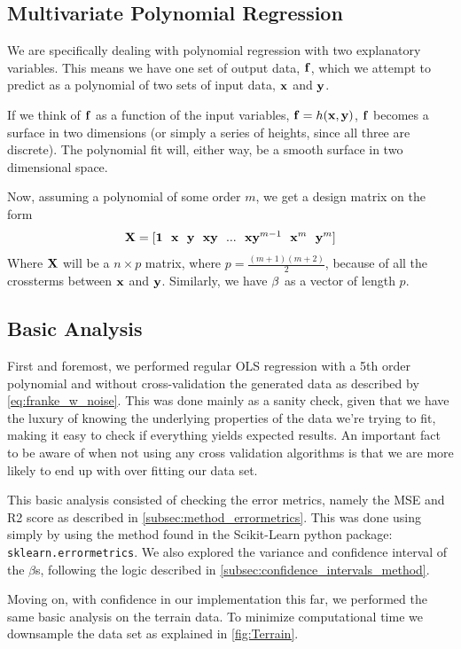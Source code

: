 \documentclass[10pt, twocolumn]{article}
\renewcommand{\b}{\boldsymbol}
\begin{document}
\subsection{Multivariate Polynomial Regression}
We are specifically dealing with polynomial regression with two explanatory variables. This means we have one set of output data, $\vb{f}$, which we attempt to predict as a polynomial of two sets of input data, $\vb{x}$ and $\vb{y}$. 

If we think of $\vb{f}$ as a function of the input variables, $\vb{f} = h(\vb{x}, \vb{y} )$, $\vb{f}$ becomes a surface in two dimensions (or simply a series of heights, since all three are discrete). The polynomial fit will, either way, be a smooth surface in two dimensional space. 

Now, assuming a polynomial of some order $m$, we get a design matrix on the form 
\begin{align}
    \vb{X} = [\b 1\ \ \vb{x} \ \ \vb{y} \b \ \ \vb{x} \vb{y} \ \ ... \ \ \vb{x} \vb{y}^{m-1} \ \ \vb{x}^m \ \ \vb{y}^m]
\end{align}
Where $\vb{X}$ will be a $n\times p$ matrix, where $p = \frac{(m + 1)(m + 2)}{2}$, because of all the crossterms between $\vb{x}$ and $\vb{y}$. Similarly, we have $\vb{\beta}$ as a vector of length $p$.

\subsection{Basic Analysis}
First and foremost, we performed regular OLS regression with a 5th order polynomial and without cross-validation the generated data as described by \cref{eq:franke_w_noise}. This was done mainly as a sanity check, given that we have the luxury of knowing the underlying properties of the data we're trying to fit, making it easy to check if everything yields expected results. An important fact to be aware of when not using any cross validation algorithms is that we are more likely to end up with over fitting our data set. 

This basic analysis consisted of checking the error metrics, namely the MSE and R2 score as described in \cref{subsec:method_errormetrics}. This was done using simply by using the method found in the Scikit-Learn python package: \texttt{sklearn.errormetrics}. We also explored the variance and confidence interval of the $\beta$s, following the logic described in \cref{subsec:confidence_intervals_method}.

Moving on, with confidence in our implementation this far, we performed the same basic analysis on the terrain data. To minimize computational time we downsample the data set as explained in \cref{fig:Terrain}. 
\end{document}
